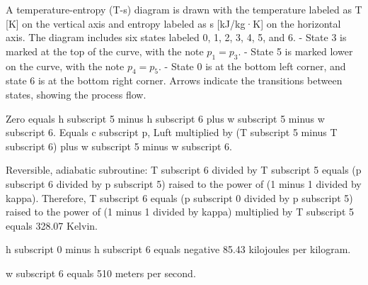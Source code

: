 A temperature-entropy (T-s) diagram is drawn with the temperature labeled as T [K] on the vertical axis and entropy labeled as s [kJ/kg·K] on the horizontal axis. The diagram includes six states labeled 0, 1, 2, 3, 4, 5, and 6.  
- State 3 is marked at the top of the curve, with the note \( p_1 = p_3 \).  
- State 5 is marked lower on the curve, with the note \( p_4 = p_5 \).  
- State 0 is at the bottom left corner, and state 6 is at the bottom right corner.  
Arrows indicate the transitions between states, showing the process flow.

Zero equals h subscript 5 minus h subscript 6 plus w subscript 5 minus w subscript 6.  
Equals c subscript p, Luft multiplied by (T subscript 5 minus T subscript 6) plus w subscript 5 minus w subscript 6.  

Reversible, adiabatic subroutine:  
T subscript 6 divided by T subscript 5 equals (p subscript 6 divided by p subscript 5) raised to the power of (1 minus 1 divided by kappa).  
Therefore, T subscript 6 equals (p subscript 0 divided by p subscript 5) raised to the power of (1 minus 1 divided by kappa) multiplied by T subscript 5 equals 328.07 Kelvin.  

h subscript 0 minus h subscript 6 equals negative 85.43 kilojoules per kilogram.  

w subscript 6 equals 510 meters per second.